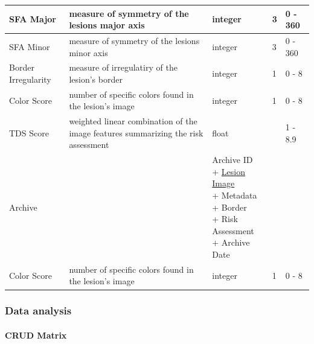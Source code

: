 \begin{longtable}[H]{ | l | p{3.0cm} | p{2.5cm} | p{1.0cm} | p{2.5cm} | }
                    SFA Major & measure of symmetry of the lesions major axis &
                    integer & 3 & 0 - 360 \\ \hline

                    SFA Minor & measure of symmetry of the lesions minor axis &
                    integer & 3 & 0 - 360 \\ \hline

                    Border Irregularity & measure of irregulatiry of the lesion's border &
                    integer & 1 & 0 - 8 \\ \hline

                    Color Score & number of specific colors found in the lesion's image &
                    integer & 1 & 0 - 8 \\ \hline

                    \hypertarget{tds_score}{TDS Score} & weighted linear combination of the image features summarizing the risk assessment  &
                    float &  & 1 - 8.9 \\ \hline

                    Archive &  &

                        \specialcell[t]{Archive ID
                            \\ + \hyperlink{lesion_image}{Lesion Image}
                            \\ + Metadata
                            \\ + Border
                            \\ + Risk Assessment
                            \\ + Archive Date
                        }

                     & & \\ \hline


                    Color Score & number of specific colors found in the lesion's image &
                    integer & 1 & 0 - 8 \\ \hline

                \end{longtable}


        \subsubsection{Data analysis}
            \paragraph{CRUD Matrix}

